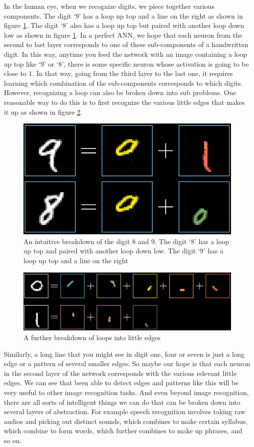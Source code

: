 \documentclass[master]{thesis-uestc}
\begin{document}
In the human eye, when we recognize digits, we piece together various components. The digit `9' has a loop up top and a line on the right as shown in figure \ref{fig_digit}. The digit `8' also has a loop up top but paired with another loop down low as shown in figure \ref{fig_digit}. In a perfect ANN, we hope that each neuron from the second to last layer corresponds to one of these sub-components of a handwritten digit. In this way, anytime you feed the network with an image containing a loop up top like `9' or `8', there is some specific neuron whose activation is going to be close to $1$. In that way, going from the third layer to the last one, it requires learning which combination of the sub-components corresponds to which digits. However, recognizing a loop can also be broken down into sub problems. One reasonable way to do this is to first recognize the various little edges that makes it up as shown in figure \ref{fig_digit_sub}.
\begin{figure}[ht]
\includegraphics[width=5in]{pic/digits.PNG}
\caption{An intuitive breakdown of the digit 8 and 9. The digit `8' has a loop up top and paired with another loop down low. The digit `9' has a loop up top and a line on the right}
\label{fig_digit}
\end{figure}
\begin{figure}[ht]
\includegraphics[width=5in]{pic/digits_subcomponents.PNG}
\caption{A further breakdown of loops into little edges}
\label{fig_digit_sub}
\end{figure}
Similarly, a long line that you might see in digit one, four or seven is just a long edge or a pattern of several smaller edges. So maybe our hope is that each neuron in the second layer of the network corresponds with the various relevant little edges. We can see that been able to detect edges and patterns like this will be very useful to other image recognition tasks. And even beyond image recognition, there are all sorts of intelligent things we can do that can be broken down into several layers of abstraction. For example speech recognition involves taking raw audios and picking out distinct sounds, which combines to make certain syllabus, which combine to form words, which further combines to make up phrases, and so on.
\end{document}
